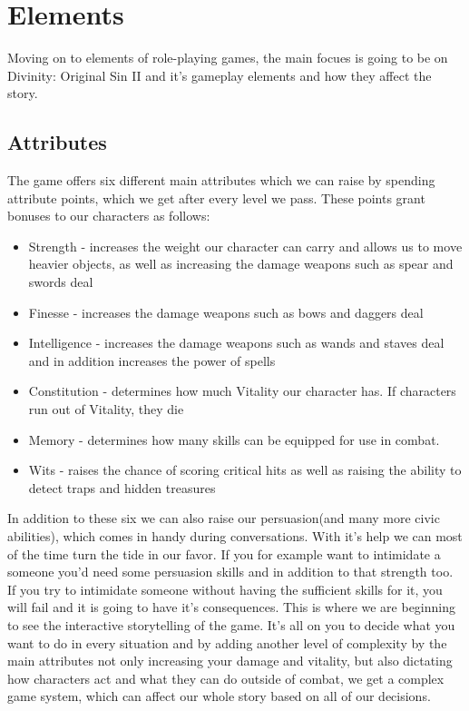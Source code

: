 \documentclass[10pt,twoside,english,a4paper]{article}
\begin{document}
\section{Elements} \label{elements}

Moving on to elements of role-playing games, the main focues is going to be on Divinity: Original Sin II and it's gameplay elements and how they affect the story.


  \subsection{Attributes}

The game offers six different main attributes which we can raise by spending attribute points, which we get after every level we pass. These points grant bonuses to our characters as follows:

\begin{itemize} %
  \item Strength - increases the weight our character can carry and allows us to move heavier objects, as well as increasing the damage weapons such as spear and swords deal
  \item Finesse - increases the damage weapons such as bows and daggers deal
  \item Intelligence - increases the damage weapons such as wands and staves deal and in addition increases the power of spells
  \item Constitution - determines how much Vitality our character has. If characters run out of Vitality, they die
  \item Memory - determines how many skills can be equipped for use in combat.
  \item Wits - raises the chance of scoring critical hits as well as raising the ability to detect traps and hidden treasures 
\end{itemize} 
In addition to these six we can also raise our persuasion(and many more civic abilities), which comes in handy during conversations. With it's help we can most of the time turn the tide in our favor. If you for example want to intimidate a someone you'd need some persuasion skills and in addition to that strength too. If you try to intimidate someone without having the sufficient skills for it, you will fail and it is going to have it's consequences. This is where we are beginning to see the interactive storytelling of the game. It's all on you to decide what you want to do in every situation and by adding another level of complexity by the main attributes not only increasing your damage and vitality, but also dictating how characters act and what they can do outside of combat, we get a complex game system, which can affect our whole story based on all of our decisions.
\end{document}
